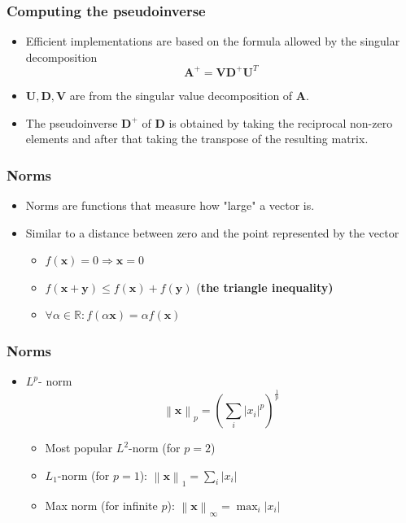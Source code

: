 \documentclass[notes]{beamer}          %
\newcommand{\vect}[1]{\bm{#1}}
\newcommand{\field}[1]{\mathbb{#1}}
\newcommand{\R}{\field{R}}
\newcommand{\norm}[1]{\left\lVert#1\right\rVert}
\providecommand{\norm}[1]{\lVert#1\rVert}
\begin{document}
\begin{frame}
\frametitle{Computing the pseudoinverse}
    \begin{itemize}
        \item Efficient implementations are based on the formula allowed by the singular decomposition
        $$
        \vect{A}^{+} = \vect{V}\vect{D}^{+}\vect{U}^T
        $$
        \item $\vect{U},\vect{D},\vect{V}$ are from the singular value decomposition of $\vect{A}$.
        \item The pseudoinverse $\vect{D}^{+}$ of $\vect{D}$ is obtained by taking the reciprocal non-zero elements and after that taking the transpose of the resulting matrix.
    \end{itemize}

\end{frame}

\fi

\begin{frame}
\frametitle{Norms}
    \begin{itemize}
        \item Norms are functions that measure how "large" a vector is.
        \item Similar to a distance between zero and the point represented by the vector
        \begin{itemize}
           \item $f(\vect{x}) = 0 \Rightarrow \vect{x} = 0$
           \item $f(\vect{x} + \vect{y}) \leq f(\vect{x}) + f(\vect{y})$ (\bf the triangle inequality)
           \item $\forall \alpha \in \R: f(\alpha \vect{x}) = \alpha f(\vect{x})$
        \end{itemize}
    \end{itemize}
\end{frame}



\begin{frame}
\frametitle{Norms}
    \begin{itemize}
        \item $L^p$- norm
        $$\norm{\vect{x}}_p = \left( \sum_i |x_i|^p  \right) ^{\frac{1}{p}}$$
        \begin{itemize}
            \item Most popular $L^2$-norm (for $p=2$)
            \item $L_1$-norm (for $p = 1$): $\norm{\vect{x}}_1 = \sum_i |x_i|$
            \item Max norm (for infinite $p$): $\norm{\vect{x}}_\infty = \max_i |x_i|$
            \end{itemize}
    \end{itemize}

\end{frame}
\end{document}
